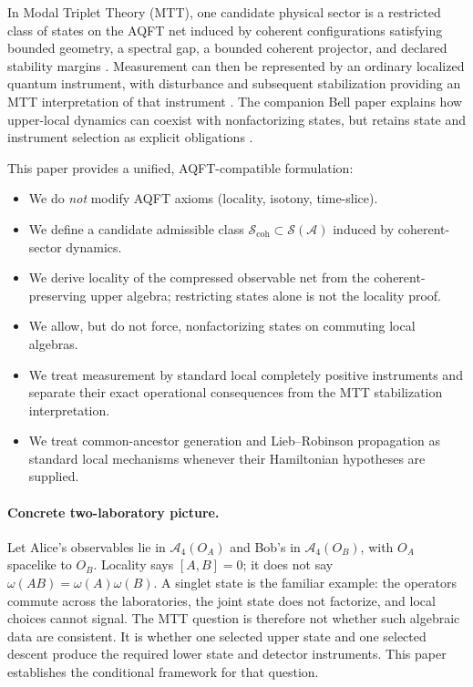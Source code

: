 \documentclass[11pt]{article}
\begin{document}
In Modal Triplet Theory (MTT), one candidate physical sector is a restricted
class of states on the AQFT net induced by coherent configurations satisfying
bounded geometry, a spectral gap, a bounded coherent projector, and declared
stability margins
\cite{MTTFoundation,FP3,FP5,FP6}.
Measurement can then be represented by an ordinary localized quantum
instrument, with disturbance and subsequent stabilization providing an MTT
interpretation of that instrument \cite{NeroMeasurement}.  The companion Bell
paper explains how upper-local dynamics can coexist with nonfactorizing
states, but retains state and instrument selection as explicit obligations
\cite{NeroBellBeables}.

This paper provides a unified, AQFT-compatible formulation:
\begin{itemize}
\item We do \emph{not} modify AQFT axioms (locality, isotony, time-slice).
\item We define a candidate admissible class
      $\mathcal{S}_{\mathrm{coh}}\subset\mathcal{S}(\mathcal{A})$ induced by
      coherent-sector dynamics.
\item We derive locality of the compressed observable net from the
      coherent-preserving upper algebra; restricting states alone is not the
      locality proof.
\item We allow, but do not force, nonfactorizing states on commuting local
      algebras.
\item We treat measurement by standard local completely positive instruments
      and separate their exact operational consequences from the MTT
      stabilization interpretation.
\item We treat common-ancestor generation and Lieb--Robinson propagation as
      standard local mechanisms whenever their Hamiltonian hypotheses are
      supplied.
\end{itemize}

\paragraph{Concrete two-laboratory picture.}
Let Alice's observables lie in $\mathcal A_4(O_A)$ and Bob's in
$\mathcal A_4(O_B)$, with $O_A$ spacelike to $O_B$.  Locality says
$[A,B]=0$; it does not say
$\omega(AB)=\omega(A)\omega(B)$.  A singlet state is the familiar example:
the operators commute across the laboratories, the joint state does not
factorize, and local choices cannot signal.  The MTT question is therefore not
whether such algebraic data are consistent.  It is whether one selected upper
state and one selected descent produce the required lower state and detector
instruments.  This paper establishes the conditional framework for that
question.
\end{document}
